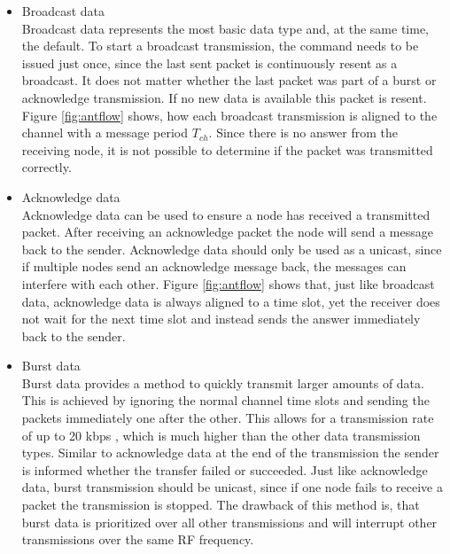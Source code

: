 \begin{itemize}
	\item{Broadcast data} \hfill \\ Broadcast data represents the most basic data type and, at the same time, the default. To start a broadcast transmission, the command needs to be issued just once, since the last sent packet is continuously resent as a broadcast. It does not matter whether the last packet was part of a burst or acknowledge transmission. If no new data is available this packet is resent. Figure \ref{fig:antflow} shows, how each broadcast transmission is aligned to the channel with a message period $T_{ch}$. Since there is no answer from the receiving node, it is not possible to determine if the packet was transmitted correctly.
	
	\item{Acknowledge data} \hfill \\ Acknowledge data can be used to ensure a node has received a transmitted packet. After receiving an acknowledge packet the node will send a message back to the sender. Acknowledge data should only be used as a unicast, since if multiple nodes send an acknowledge message back, the messages can interfere with each other. Figure \ref{fig:antflow} shows that, just like broadcast data, acknowledge data is always aligned to a time slot, yet the receiver does not wait for the next time slot and instead sends the answer immediately back to the sender.
	
	\item{Burst data} \hfill \\ Burst data provides a method to quickly transmit larger amounts of data. This is achieved by ignoring the normal channel time slots and sending the packets immediately one after the other. This allows for a transmission rate of up to 20 kbps \cite{DynastreamInnovationsInc.2013}, which is much higher than the other data transmission types. Similar to acknowledge data at the end of the transmission the sender is informed whether the transfer failed or succeeded. Just like acknowledge data, burst transmission should be unicast, since if one node fails to receive a packet the transmission is stopped. The drawback of this method is, that burst data is prioritized over all other transmissions and will interrupt other transmissions over the same RF frequency.
\end{itemize}

